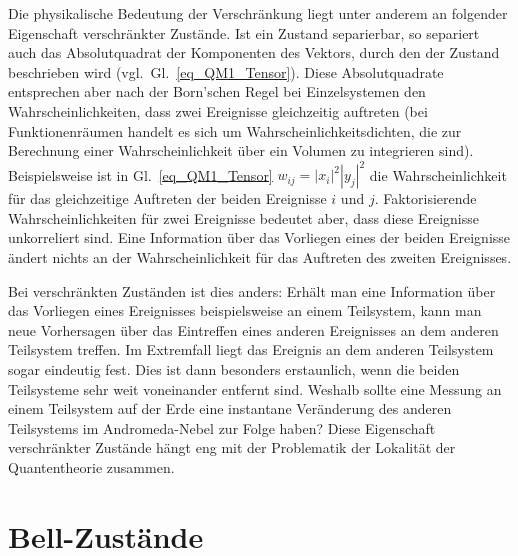 Die physikalische Bedeutung der Verschr\"ankung liegt unter anderem an folgender Eigenschaft 
verschr\"ankter Zust\"ande. Ist ein Zustand separierbar, so separiert auch das Absolutquadrat 
der Komponenten des Vektors, durch den der Zustand beschrieben wird (vgl.\ Gl.\ \ref{eq_QM1_Tensor}).
Diese Absolutquadrate entsprechen aber nach der Born'schen Regel 
bei Einzelsystemen den Wahrscheinlichkeiten, dass 
zwei Ereignisse gleichzeitig auftreten (bei Funktionenr\"aumen handelt es sich um Wahrscheinlichkeitsdichten,
die zur Berechnung einer Wahrscheinlichkeit \"uber ein Volumen zu integrieren sind). Beispielsweise ist
in Gl.\ \ref{eq_QM1_Tensor} $w_{ij}=|x_i|^2|y_j|^2$ die Wahrscheinlichkeit f\"ur das gleichzeitige Auftreten der
beiden Ereignisse $i$ und $j$. Faktorisierende
Wahrscheinlichkeiten f\"ur zwei Ereignisse bedeutet aber, dass diese Ereignisse unkorreliert sind. 
Eine Information \"uber das Vorliegen eines der beiden Ereignisse \"andert nichts an der Wahrscheinlichkeit
f\"ur das Auftreten des zweiten Ereignisses. 

Bei verschr\"ankten Zust\"anden ist dies anders: Erh\"alt man eine Information \"uber das Vorliegen eines
Ereignisses beispielsweise an einem Teilsystem, kann man neue Vorhersagen \"uber das Eintreffen eines 
anderen Ereignisses an dem anderen Teilsystem treffen. Im Extremfall liegt das Ereignis an dem anderen
Teilsystem sogar eindeutig fest. Dies ist dann besonders erstaunlich, wenn die beiden Teilsysteme
sehr weit voneinander entfernt sind. Weshalb sollte eine Messung an einem Teilsystem auf der Erde
eine instantane Ver\"anderung des anderen Teilsystems im Andromeda-Nebel zur Folge haben? Diese
Eigenschaft verschr\"ankter Zust\"ande h\"angt eng mit der Problematik der Lokalit\"at der Quantentheorie
zusammen. 

\section{Bell-Zust\"ande}

